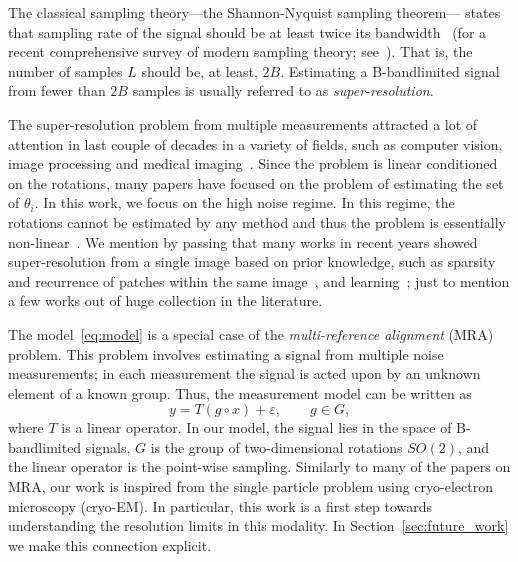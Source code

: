 \documentclass[english,12pt]{article}
\numberwithin{equation}{section}
\numberwithin{thm}{section} %
\begin{document}
The classical sampling theory---the Shannon-Nyquist sampling theorem--- states that sampling rate of the signal should be at least twice its bandwidth~\cite{shannon1949communication} (for a recent comprehensive survey of modern sampling theory; see~\cite{eldar2015sampling}).
That is, the number of samples $L$ should be, at least, $2B$. 
Estimating a B-bandlimited signal from fewer than $2B$ samples is usually referred to as \emph{super-resolution}. 

The super-resolution problem from multiple measurements attracted a lot of attention in last couple of decades in a variety of fields, such as computer vision, image processing and medical imaging~\cite{park2003super,farsiu2004advances, greenspan2008super}.
Since the problem is linear conditioned on the rotations, many papers have focused on the problem of estimating the set of $\theta_i$. In this work, we focus on the high noise regime. In this regime, the rotations cannot be estimated by any method and thus the problem is essentially non-linear~\cite{bendory2018toward,aguerrebere2016fundamental}. 
We mention by passing that many works in recent years showed super-resolution from a single image based on prior knowledge, such as sparsity~\cite{huang2009super,candes2014towards} and recurrence of patches within the same image~\cite{glasner2009super},
and learning~\cite{lim2017enhanced}; just to mention a few works out of huge collection in the literature. 

The model~\eqref{eq:model} is a special case of the \emph{multi-reference alignment} (MRA) problem. This problem involves estimating a signal from multiple noise measurements; in each measurement the signal is acted upon by an unknown element of a known group. 
Thus, the measurement model can be written as 
\begin{equation}
y = T(g\circ x) +\varepsilon, \qquad g\in G,
\end{equation}
where $T$ is a linear operator. 
In our model, the signal lies in the space of B-bandlimited signals, $G$ is the group of two-dimensional rotations $SO(2)$, and the linear operator is the point-wise sampling.
Similarly to many of the papers on MRA, our work is inspired from the single particle problem using cryo-electron microscopy (cryo-EM). 
In particular, this work is a first step towards understanding the resolution limits in this modality. In Section~\ref{sec:future_work} we make this connection explicit.
\end{document}
